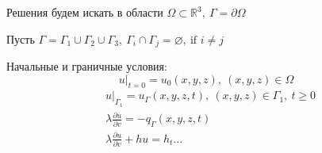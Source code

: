 \documentclass[a4paper]{article}
\theoremstyle{definition}
\theoremstyle{remark}
\begin{document}
Решения будем искать в области $ \Omega \subset \mathbb{R}^3, \ \Gamma = 
\partial \Omega$ 

Пусть $ \Gamma = \Gamma_1 \cup \Gamma_2 \cup \Gamma_3, \ \Gamma_i \cap \Gamma_j
= \varnothing, \ \text{if } i \neq j$ 

Начальные и граничные условия:
\[
    u|_{t=0} = u_0(x,y,z), \ (x,y,z) \in \Omega
\]
\begin{subequations}
    \begin{align}
        &u|_{\Gamma_1} = u_{\Gamma}(x,y,z,t), \ (x,y,z) \in \Gamma_1, \ t \geq 0\\
        &\lambda \frac{\partial u}{\partial v} = -q_{\Gamma}(x,y,z,t)\\
        &\lambda \frac{\partial u}{\partial v} + hu = h_t...
    \end{align}
\end{subequations}
\end{document}
